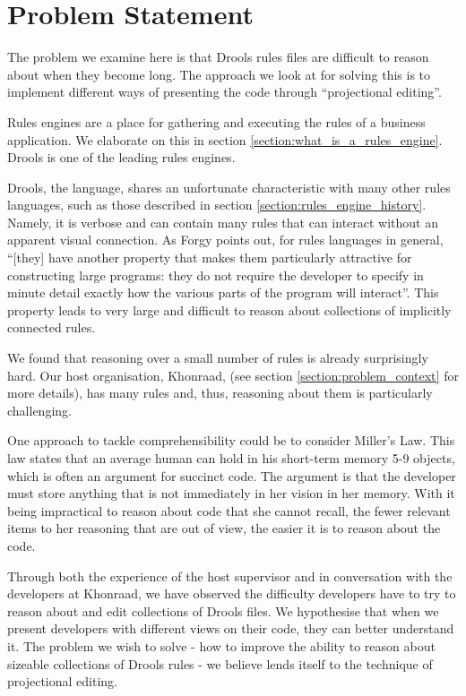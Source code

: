 \section{Problem Statement}
\label{section:problem_statement}

The problem we examine here is that Drools rules files are difficult to reason about when they become long.
The approach we look at for solving this is to implement different ways of presenting the code through ``projectional editing''.

Rules engines are a place for gathering and executing the rules of a business application.
We elaborate on this in section \ref{section:what_is_a_rules_engine}.
Drools is one of the leading rules engines.

Drools, the language, shares an unfortunate characteristic with many other rules languages, such as those described in section \ref{section:rules_engine_history}.
Namely, it is verbose and can contain many rules that can interact without an apparent visual connection.
As Forgy\cite{forgy1989rete} points out, for rules languages in general, ``[they] have another property that makes them particularly attractive for constructing large programs: they do not require the developer to specify in minute detail exactly how the various parts of the program will interact''.
This property leads to very large and difficult to reason about collections of implicitly connected rules.

We found that reasoning over a small number of rules is already surprisingly hard.
Our host organisation, Khonraad, (see section \ref{section:problem_context} for more details), has many rules and, thus, reasoning about them is particularly challenging.

One approach to tackle comprehensibility could be to consider Miller's Law\cite{miller1956magical}.
This law states that an average human can hold in his short-term memory 5-9 objects, which is often an argument for succinct code.
The argument is that the developer must store anything that is not immediately in her vision in her memory.
With it being impractical to reason about code that she cannot recall, the fewer relevant items to her reasoning that are out of view, the easier it is to reason about the code.

Through both the experience of the host supervisor and in conversation with the developers at Khonraad, we have observed the difficulty developers have to try to reason about and edit collections of Drools files.
We hypothesise that when we present developers with different views on their code, they can better understand it.
The problem we wish to solve - how to improve the ability to reason about sizeable collections of Drools rules - we believe lends itself to the technique of projectional editing.

